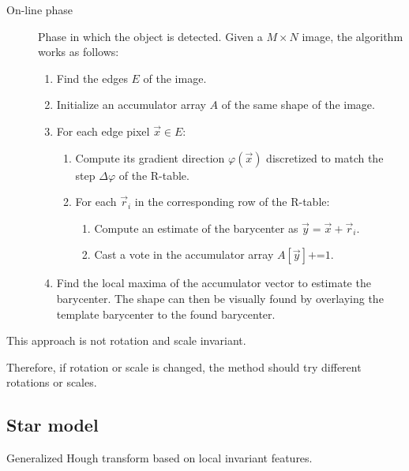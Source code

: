 \begin{description}
    \item[On-line phase]
        Phase in which the object is detected.
        Given a $M \times N$ image, the algorithm works as follows:
        \begin{enumerate}
            \item Find the edges $E$ of the image.
            \item Initialize an accumulator array $A$ of the same shape of the image.
            \item For each edge pixel $\vec{x} \in E$:
                \begin{enumerate}
                    \item Compute its gradient direction $\varphi(\vec{x})$ discretized to match the step $\Delta \varphi$ of the R-table.
                    \item For each $\vec{r}_i$ in the corresponding row of the R-table:
                    \begin{enumerate}
                        \item Compute an estimate of the barycenter as $\vec{y} = \vec{x} + \vec{r}_i$.
                        \item Cast a vote in the accumulator array $A[\vec{y}] \texttt{+=} 1$.
                    \end{enumerate}
                \end{enumerate}
            \item Find the local maxima of the accumulator vector to estimate the barycenter.
                The shape can then be visually found by overlaying the template barycenter to the found barycenter.
        \end{enumerate}
\end{description}

\begin{remark}
    This approach is not rotation and scale invariant.

    Therefore, if rotation or scale is changed, the method should try different rotations or scales.
\end{remark}


\subsection{Star model}

Generalized Hough transform based on local invariant features.


